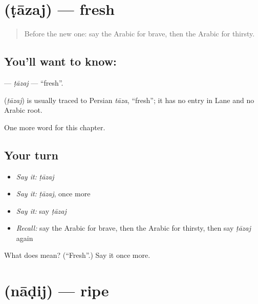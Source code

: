 \section[\texorpdfstring{\ar{طازج} (ṭāzaj)}{طازج (ṭāzaj)}]{ (ṭāzaj) — fresh}

\label{lesson:AR-C153-tazaj}



\begin{quote}
Before the new one: say the Arabic for brave, then the Arabic for thirsty.
\end{quote}

\subsection*{You'll want to know: }
\textbf{} — \emph{ṭāzaj} — \textquotedblleft{}fresh\textquotedblright{}.

\begin{cousinweb}
\textbf{} (\emph{ṭāzaj}) is usually traced to Persian \emph{tāza}, \textquotedblleft{}fresh\textquotedblright{}; it has no entry in Lane and no Arabic root.
\end{cousinweb}

\begin{grammarlens}[title={What you've built}]
One more word for this chapter.
\end{grammarlens}

\subsection*{Your turn}
\begin{itemize}
\raggedright
  \item \emph{Say it:} \emph{ṭāzaj}
  \item \emph{Say it:} \emph{ṭāzaj}, once more
  \item \emph{Say it:} say \emph{ṭāzaj}
  \item \emph{Recall:} say the Arabic for brave, then the Arabic for thirsty, then say \emph{ṭāzaj} again
\end{itemize}

\begin{tcolorbox}[breakable,colback=teal!4,colframe=teal!35!black,title={Before you move on}]
What does  mean? (\textquotedblleft{}Fresh\textquotedblright{}.) Say it once more.
\end{tcolorbox}
\section[\texorpdfstring{\ar{ناضج} (nāḍij)}{ناضج (nāḍij)}]{ (nāḍij) — ripe}

